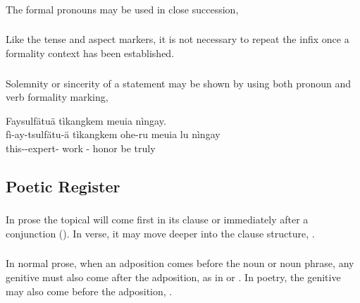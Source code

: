 \subsubsection{} The formal pronouns may be used in close succession,
 

\subsubsection{} Like the tense and aspect markers, it is not
necessary to repeat the infix  once a formality context
has been established.

\subsubsection{} Solemnity or sincerity of a statement may be shown by
using both pronoun and verb formality marking,

\begin{interlin}
\glll Faysulfätuä tìkangkem  meuia  nìngay. \\
      fì-ay-tsulfätu-ä tìkangkem ohe-ru meuia lu nìngay \\
      this--expert- work - honor be truly \\
 \Ipawl{}
\end{interlin}


\subsection{Poetic Register}

\subsubsection{} In prose the topical will come first in its clause or
immediately after a conjunction ().
In verse, it may move deeper into the clause structure,
 .

\subsubsection{} In normal prose, when an adposition comes before the
noun or noun phrase, any genitive must also come after the adposition,
as in  or  .  In
poetry, the genitive may also come before the adposition, . 

